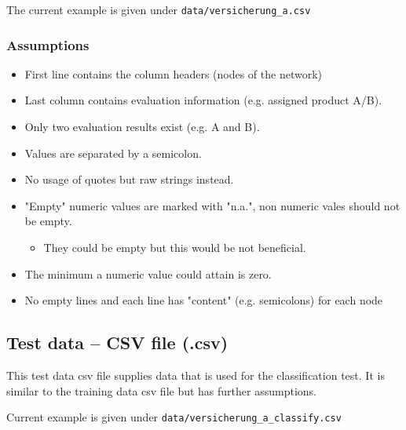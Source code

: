 \documentclass[12pt]{scrartcl}
\begin{document}
The current example is given under \texttt{data/versicherung_a.csv}

\subsubsection{Assumptions}
\begin{itemize}
    \item First line contains the column headers (nodes of the network)
    \item Last column contains evaluation information (e.g. assigned product A/B).
    \item Only two evaluation results exist (e.g. A and B).
    \item Values are separated by a semicolon.
    \item No usage of quotes but raw strings instead.
    \item "Empty" numeric values are marked with "n.a.", non numeric vales should not be empty.
    \begin{itemize}
        \item They could be empty but this would be not beneficial.
    \end{itemize}
    \item The minimum a numeric value could attain is zero.
    \item No empty lines and each line has "content" (e.g. semicolons) for each node
\end{itemize}


\subsection{Test data -- CSV file (.csv)}
This test data csv file supplies data that is used for the classification test. It is similar to the training data csv file but has further assumptions.

Current example is given under \texttt{data/versicherung_a_classify.csv}
\end{document}
